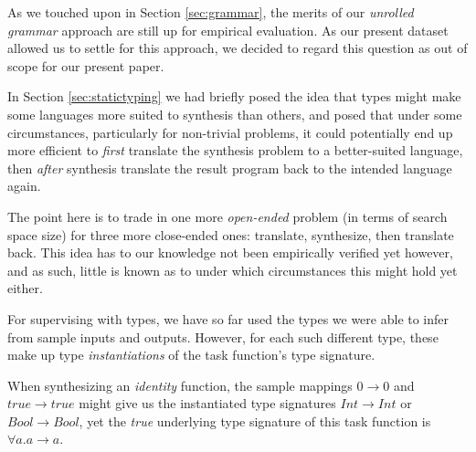 \documentclass{article}
\begin{document}


    As we touched upon in Section \ref{sec:grammar},
    the merits of our \emph{unrolled grammar} approach are still up for empirical evaluation.
    As our present dataset allowed us to settle for this approach,
    we decided to regard this question as out of scope for our present paper.

    In Section \ref{sec:statictyping} we had briefly posed the idea that types might make some languages more suited to synthesis than others,
    and posed that under some circumstances,
    particularly for non-trivial problems,
    it could potentially end up more efficient 
    to \emph{first} translate the synthesis problem to a better-suited language,
    then \emph{after} synthesis translate the result program back to the intended language again.

    The point here is to trade in one more \emph{open-ended} problem (in terms of search space size) for three more close-ended ones:
    translate, synthesize, then translate back.
    This idea has to our knowledge not been empirically verified yet however,
    and as such, little is known as to under which circumstances this might hold yet either. 

    For supervising with types, we have so far used the types we were able to infer from sample inputs and outputs.
    However, for each such different type,
    these make up type \emph{instantiations} of the task function's type signature.

    When synthesizing an \emph{identity} function,
    the sample mappings $0 \rightarrow 0$ and $true \rightarrow true$
    might give us the instantiated type signatures
    $Int \rightarrow Int$ or $Bool \rightarrow Bool$,
    yet the \emph{true} underlying type signature of this task function is $\forall a . a \rightarrow a$.
\end{document}
